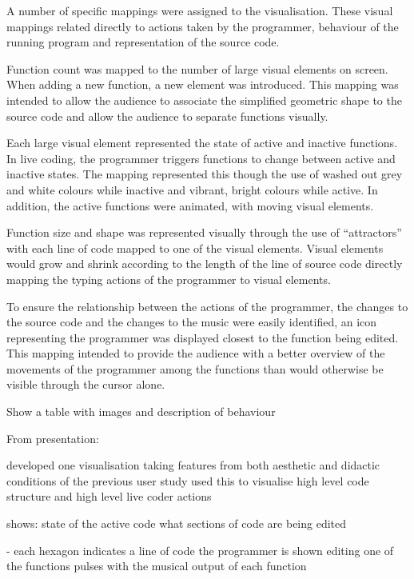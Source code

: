 A number of specific mappings were assigned to the visualisation. These visual mappings related directly to actions taken by the programmer, behaviour of the running program and representation of the source code. 

Function count was mapped to the number of large visual elements on screen. When adding a new function, a new element was introduced. This mapping was intended to allow the audience to associate the simplified geometric shape to the source code and allow the audience to separate functions visually.

Each large visual element represented the state of active and inactive functions. In live coding, the programmer triggers functions to change between active and inactive states. The mapping represented this though the use of washed out grey and white colours while inactive and vibrant, bright colours while active. In addition, the active functions were animated, with moving visual elements.

Function size and shape was represented visually through the use of ``attractors'' with each line of code mapped to one of the visual elements. Visual elements would grow and shrink according to the length of the line of source code directly mapping the typing actions of the programmer to visual elements.  


To ensure the relationship between the actions of the programmer, the changes to the source code and the changes to the music were easily identified, an icon representing the programmer was displayed closest to the function being edited. This mapping intended to provide the audience with a better overview of the movements of the programmer among the functions than would otherwise be visible through the cursor alone.  

{\color{red} Show a table with images and description of behaviour}

From presentation:

developed one visualisation taking features from both aesthetic and didactic conditions of the previous user study
used this to visualise high level code structure and high level live coder actions

shows:
state of the active code
what sections of code are being edited

-  each hexagon indicates a line of code
the programmer is shown editing one of the functions
pulses with the musical output of each function

